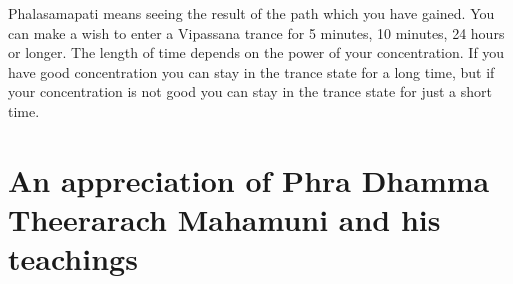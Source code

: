 \documentclass[a5paper,10pt,english]{book}
\begin{document}
\sphinxAtStartPar
Phalasamapati means seeing the result of the path which you have gained. You can make a wish to enter a Vipassana trance for 5 minutes, 10 minutes, 24 hours or longer. The length of time depends on the power of your concentration. If you have good concentration you can stay in the trance state for a long time, but if your concentration is not good you can stay in the trance state for just a short time.

\appendix


\sphinxstepscope


\chapter{An appreciation of Phra Dhamma Theerarach Mahamuni and his teachings}
\label{\detokenize{appreciation:an-appreciation-of-phra-dhamma-theerarach-mahamuni-and-his-teachings}}\label{\detokenize{appreciation::doc}}
\sphinxAtStartPar
{}
\end{document}
